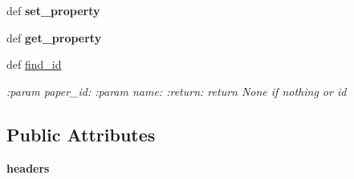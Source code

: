 \begin{DoxyCompactItemize}
\item 
def {\bfseries set\+\_\+property}\hypertarget{classplume-creator_1_1src_1_1plume_1_1gui_1_1models_1_1property__model_1_1_property_model_a9893efbf887a585f41a90ac176020b61}{}\label{classplume-creator_1_1src_1_1plume_1_1gui_1_1models_1_1property__model_1_1_property_model_a9893efbf887a585f41a90ac176020b61}

\item 
def {\bfseries get\+\_\+property}\hypertarget{classplume-creator_1_1src_1_1plume_1_1gui_1_1models_1_1property__model_1_1_property_model_aeb2ffc20d8d077fd40660f1bd726737e}{}\label{classplume-creator_1_1src_1_1plume_1_1gui_1_1models_1_1property__model_1_1_property_model_aeb2ffc20d8d077fd40660f1bd726737e}

\item 
def \hyperlink{classplume-creator_1_1src_1_1plume_1_1gui_1_1models_1_1property__model_1_1_property_model_aaeb78a25015f67678688c7f9ec81893f}{find\+\_\+id}\hypertarget{classplume-creator_1_1src_1_1plume_1_1gui_1_1models_1_1property__model_1_1_property_model_aaeb78a25015f67678688c7f9ec81893f}{}\label{classplume-creator_1_1src_1_1plume_1_1gui_1_1models_1_1property__model_1_1_property_model_aaeb78a25015f67678688c7f9ec81893f}

\begin{DoxyCompactList}\small\item\em \+:param paper\+\_\+id\+: \+:param name\+: \+:return\+: return None if nothing or id \end{DoxyCompactList}\end{DoxyCompactItemize}
\subsection*{Public Attributes}
\begin{DoxyCompactItemize}
\item 
{\bfseries headers}\hypertarget{classplume-creator_1_1src_1_1plume_1_1gui_1_1models_1_1property__model_1_1_property_model_a8b6fe49a67a987f9d1e0418c9cfdd611}{}\label{classplume-creator_1_1src_1_1plume_1_1gui_1_1models_1_1property__model_1_1_property_model_a8b6fe49a67a987f9d1e0418c9cfdd611}

\end{DoxyCompactItemize}
